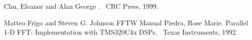 \documentclass{beamer}
\begin{document}

\begin{frame}[allowframebreaks]
    
  \begin{thebibliography}{10}
    
  \beamertemplatebookbibitems

    Chu, Eleanor and Alan George
    .
    \newblock \ CRC Press, 1999.
 
    
  \beamertemplatearticlebibitems

   Matteo Frigo and Steven G. Johnson
    \newblock FFTW Manual
 Piedra, Rose Marie. 
 \newblock Parallel 1-D FFT: Implementation with TMS320C4x DSPs. 
 \newblock \ Texas Instruments, 1992.
  \end{thebibliography}
\end{frame}
\end{document}
